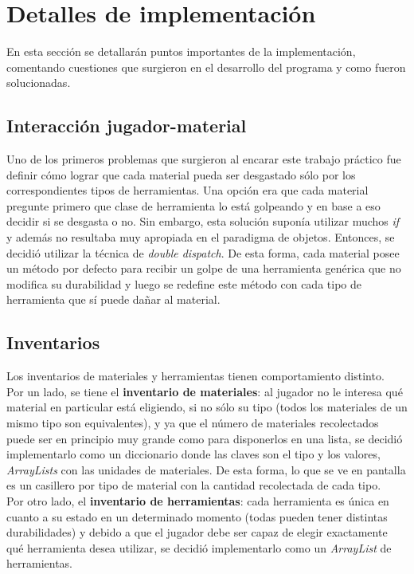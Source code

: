 \documentclass[titlepage,a4paper]{article}
\begin{document}
\section{Detalles de implementación}\label{sec:implementacion}
En esta sección se detallarán puntos importantes de la implementación, comentando cuestiones que surgieron en el desarrollo del programa y como fueron solucionadas.
\subsection{Interacción jugador-material}
	Uno de los primeros problemas que surgieron al encarar este trabajo práctico fue definir cómo lograr que cada material pueda ser desgastado sólo por los correspondientes tipos de herramientas. Una opción era que cada material pregunte primero que clase de herramienta lo está golpeando y en base a eso decidir si se desgasta o no. Sin embargo, esta solución suponía utilizar muchos \emph{if} y además no resultaba muy apropiada en el paradigma de objetos. Entonces, se decidió utilizar la técnica de \emph{double dispatch}. De esta forma, cada material posee un método por defecto para recibir un golpe de una herramienta genérica que no modifica su durabilidad y luego se redefine este método con cada tipo de herramienta que sí puede dañar al material.
\subsection{Inventarios}
	Los inventarios de materiales y herramientas tienen comportamiento distinto.\\Por un lado, se tiene el \textbf{inventario de materiales}: al jugador no le interesa qué material en particular está eligiendo, si no sólo su tipo (todos los materiales de un mismo tipo son equivalentes), y ya que el número de materiales recolectados puede ser en principio muy grande como para disponerlos en una lista, se decidió implementarlo como un diccionario donde las claves son el tipo y los valores, \emph{ArrayLists} con las unidades de materiales. De esta forma, lo que se ve en pantalla es un casillero por tipo de material con la cantidad recolectada de cada tipo.\\
Por otro lado, el \textbf{inventario de herramientas}: cada herramienta es única en cuanto a su estado en un determinado momento (todas pueden tener distintas durabilidades) y debido a que el jugador debe ser capaz de elegir exactamente qué herramienta desea utilizar, se decidió implementarlo como un \emph{ArrayList} de herramientas.
\end{document}
